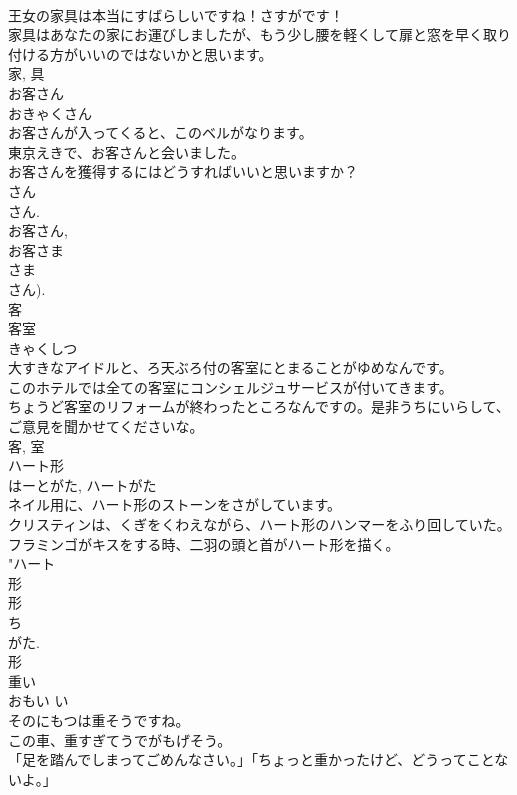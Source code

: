 \documentclass[8pt]{extreport}
\begin{document}
\begin{CJK}{UTF8}{min}
\\	王女の家具は本当にすばらしいですね！さすがです！	
\\	家具はあなたの家にお運びしましたが、もう少し腰を軽くして扉と窓を早く取り付ける方がいいのではないかと思います。	
\\	家, 具	
\\	お客さん	
\\	おきゃくさん	
\\	お客さんが入ってくると、このベルがなります。	
\\	東京えきで、お客さんと会いました。	
\\	お客さんを獲得するにはどうすればいいと思いますか？	
\\	さん 
\\	さん. 
\\	お客さん, 
\\	お客さま 
\\	さま 
\\	さん).
\\	客	
\\	客室	
\\	きゃくしつ	
\\	大すきなアイドルと、ろ天ぶろ付の客室にとまることがゆめなんです。	
\\	このホテルでは全ての客室にコンシェルジュサービスが付いてきます。	
\\	ちょうど客室のリフォームが終わったところなんですの。是非うちにいらして、ご意見を聞かせてくださいな。	
\\	客, 室	
\\	ハート形	
\\	はーとがた, ハートがた	
\\	ネイル用に、ハート形のストーンをさがしています。	
\\	クリスティンは、くぎをくわえながら、ハート形のハンマーをふり回していた。	
\\	フラミンゴがキスをする時、二羽の頭と首がハート形を描く。	
\\	"ハート 
\\	形 
\\	形 
\\	ち 
\\	がた. 
\\	形	
\\	重い	
\\	おもい	い 
\\	そのにもつは重そうですね。	
\\	この車、重すぎてうでがもげそう。	
\\	「足を踏んでしまってごめんなさい。」「ちょっと重かったけど、どうってことないよ。」	

\end{CJK}
\end{document}

